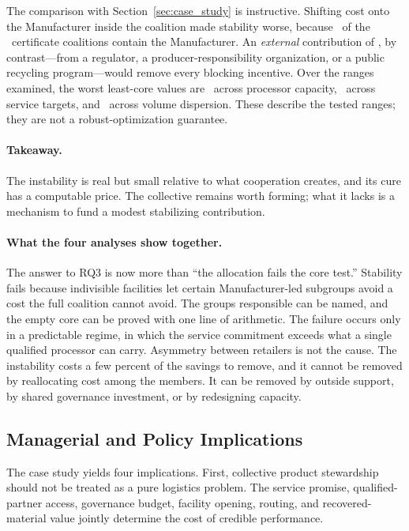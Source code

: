 The comparison with Section~\ref{sec:case_study} is instructive. Shifting cost onto the Manufacturer inside the coalition made stability worse, because \ChFourCertificateWithManufacturer\ of the \ChFourCertificateSize\ certificate coalitions contain the Manufacturer. An \emph{external} contribution of \ChFourCostOfStability, by contrast---from a regulator, a producer-responsibility organization, or a public recycling program---would remove every blocking incentive. Over the ranges examined, the worst least-core values are \ChFourCapPeakEpsilon\ across processor capacity, \ChFourServicePeakEpsilon\ across service targets, and \ChFourEqualVolumeEpsilon\ across volume dispersion. These describe the tested ranges; they are not a robust-optimization guarantee.

\paragraph{Takeaway.} The instability is real but small relative to what cooperation creates, and its cure has a computable price. The collective remains worth forming; what it lacks is a mechanism to fund a modest stabilizing contribution.

\paragraph{What the four analyses show together.} The answer to RQ3 is now more than ``the allocation fails the core test.'' Stability fails because indivisible facilities let certain Manufacturer-led subgroups avoid a cost the full coalition cannot avoid. The groups responsible can be named, and the empty core can be proved with one line of arithmetic. The failure occurs only in a predictable regime, in which the service commitment exceeds what a single qualified processor can carry. Asymmetry between retailers is not the cause. The instability costs a few percent of the savings to remove, and it cannot be removed by reallocating cost among the members. It can be removed by outside support, by shared governance investment, or by redesigning capacity.

\subsection{Managerial and Policy Implications}

The case study yields four implications. First, collective product stewardship should not be treated as a pure logistics problem. The service promise, qualified-partner access, governance budget, facility opening, routing, and recovered-material value jointly determine the cost of credible performance.

